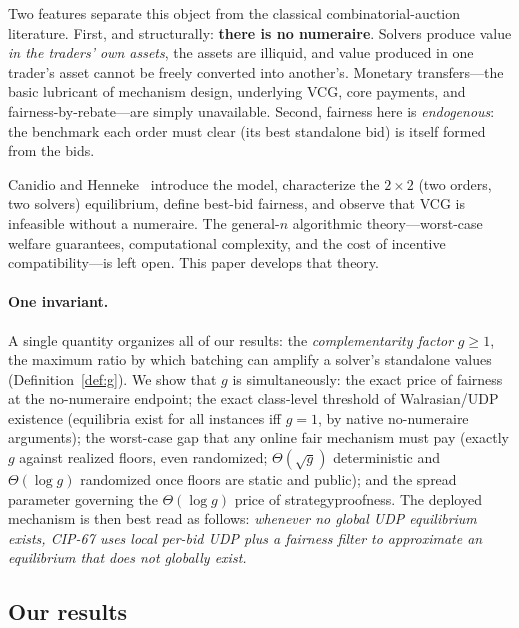 \documentclass[11pt]{article}
\theoremstyle{remark}
\begin{document}
Two features separate this object from the classical combinatorial-auction
literature. First, and structurally: \textbf{there is no numeraire}. Solvers
produce value \emph{in the traders' own assets}, the assets are illiquid, and
value produced in one trader's asset cannot be freely converted into
another's. Monetary transfers---the basic lubricant of mechanism design,
underlying VCG, core payments, and fairness-by-rebate---are simply
unavailable. Second, fairness here is \emph{endogenous}: the benchmark each
order must clear (its best standalone bid) is itself formed from the bids.

Canidio and Henneke~\cite{canidio2024} introduce the model, characterize the
$2\times2$ (two orders, two solvers) equilibrium, define best-bid fairness,
and observe that VCG is infeasible without a numeraire. The general-$n$
algorithmic theory---worst-case welfare guarantees, computational complexity,
and the cost of incentive compatibility---is left open. This paper develops
that theory.

\paragraph{One invariant.}
A single quantity organizes all of our results: the \emph{complementarity
factor} $g\ge 1$, the maximum ratio by which batching can amplify a solver's
standalone values (Definition~\ref{def:g}). We show that $g$ is
simultaneously: the exact price of fairness at the no-numeraire endpoint;
the exact class-level threshold of Walrasian/UDP existence (equilibria
exist for all instances iff $g=1$, by native no-numeraire arguments);
the worst-case gap that any online fair mechanism must pay (exactly $g$
against realized floors, even randomized; $\Theta(\sqrt g)$
deterministic and $\Theta(\log g)$ randomized once floors are static
and public); and the spread
parameter governing the $\Theta(\log g)$ price of strategyproofness. The
deployed mechanism is then best read as follows: \emph{whenever no
global UDP equilibrium exists, CIP-67 uses local per-bid UDP plus a fairness
filter to approximate an equilibrium that does not globally exist.}

\subsection{Our results}
\end{document}
